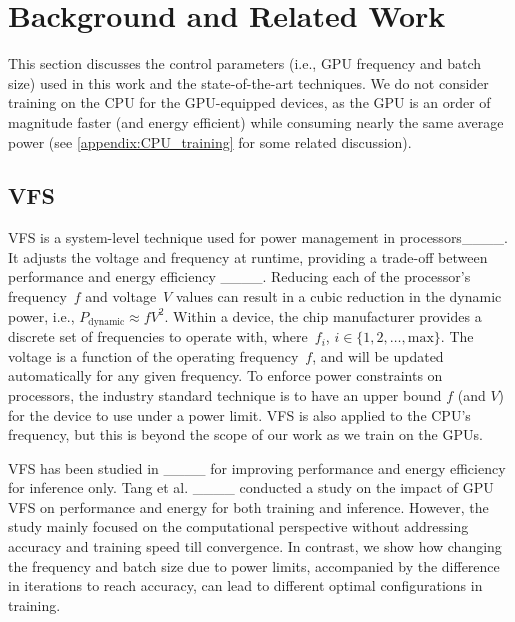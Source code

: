 \section{Background and Related Work}
\label{sec:background}
This section discusses the control parameters (i.e., GPU frequency and batch size)  used in this work and the state-of-the-art techniques.
We do not consider training on the CPU for the GPU-equipped devices, as the GPU is an order of magnitude faster (and energy efficient) while consuming nearly the same average power (see \cref{appendix:CPU_training} for some related discussion).

\subsection{\ac{VFS}} 
\label{sec:vfs}
\ac{VFS} is a system-level technique used for power management in processors____. 
It adjusts the voltage and frequency at runtime, providing a trade-off between performance and energy efficiency ____. Reducing each of the processor's frequency~$f$ and voltage~$V$ values can result in a cubic reduction in the dynamic power, i.e., 
$
    P_{\text{dynamic}} \approx fV^{2}.
$
Within a device, the chip manufacturer provides a discrete set of frequencies to operate with, where~$f_{i}$,  $i \in \{1, 2, \ldots , \text{max}\}$. 
The voltage is a function of the operating frequency~$f$, and will be updated automatically for any given frequency. 
To enforce power constraints on processors, the industry standard technique is to have an upper bound $f$ (and $V$) for the device to use under a power limit. \ac{VFS} is also applied to the CPU's frequency, but this is beyond the scope of our work as we train on the GPUs.


\ac{VFS} has been studied in ____ for improving performance and energy efficiency for inference only. Tang et al. ____ conducted a study on the impact of GPU \ac{VFS} on performance and energy for both training and inference. However, the study mainly focused on the computational perspective without addressing accuracy and training speed till convergence. In contrast, we show how changing the frequency and batch size due to power limits, accompanied by the difference in iterations to reach accuracy, can lead to different optimal configurations in training. 





